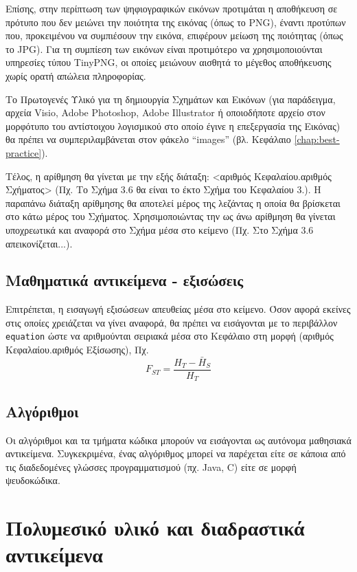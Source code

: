 Επίσης, στην περίπτωση των ψηφιογραφικών εικόνων προτιμάται η αποθήκευση σε
πρότυπο που δεν μειώνει την ποιότητα της εικόνας (όπως το PNG), έναντι προτύπων που,
προκειμένου να συμπιέσουν την εικόνα, επιφέρουν μείωση της ποιότητας (όπως το JPG).
Για τη συμπίεση των εικόνων είναι προτιμότερο να χρησιμοποιούνται υπηρεσίες τύπου
TinyPNG, οι οποίες μειώνουν αισθητά το μέγεθος αποθήκευσης χωρίς ορατή απώλεια
πληροφορίας.

Το Πρωτογενές Υλικό για τη δημιουργία Σχημάτων και Εικόνων (για παράδειγμα,
αρχεία Visio, Adobe Photoshop, Adobe Illustrator ή οποιοδήποτε αρχείο στον μορφότυπο
του αντίστοιχου λογισμικού στο οποίο έγινε η επεξεργασία της Εικόνας) θα πρέπει να
συμπεριλαμβάνεται στον φάκελο “images” (βλ. Κεφάλαιο \ref{chap:best-practice}).

Τέλος, η αρίθμηση θα γίνεται με την εξής διάταξη: <αριθμός Κεφαλαίου.αριθμός
Σχήματος> (Πχ. Το Σχήμα 3.6 θα είναι το έκτο Σχήμα του Κεφαλαίου 3.). Η παραπάνω
διάταξη αρίθμησης θα αποτελεί μέρος της λεζάντας η οποία θα βρίσκεται στο κάτω μέρος
του Σχήματος. Χρησιμοποιώντας την ως άνω αρίθμηση θα γίνεται υποχρεωτικά και
αναφορά στο Σχήμα μέσα στο κείμενο (Πχ. Στο Σχήμα 3.6 απεικονίζεται...).

\subsection{Μαθηματικά αντικείμενα - εξισώσεις}

Επιτρέπεται, η εισαγωγή εξισώσεων απευθείας μέσα στο κείμενο. Όσον αφορά εκείνες στις οποίες χρειάζεται να
γίνει αναφορά, θα πρέπει να εισάγονται με το περιβάλλον \texttt{equation} ώστε να αριθμούνται σειριακά
μέσα στο Κεφάλαιο στη μορφή (αριθμός Κεφαλαίου.αριθμός Εξίσωσης), Πχ.
\begin{equation}
\label{eq:11_19}
F_{ST}=\frac{H_{T}-\bar{H}_{S}}{H_{T}}
\end{equation}
\subsection{Αλγόριθμοι}

Οι αλγόριθμοι και τα τμήματα κώδικα μπορούν να εισάγονται ως αυτόνομα μαθησιακά
αντικείμενα. Συγκεκριμένα, ένας αλγόριθμος μπορεί να παρέχεται είτε σε κάποια από τις
διαδεδομένες γλώσσες προγραμματισμού (πχ. Java, C) είτε σε μορφή ψευδοκώδικα.

\section{Πολυμεσικό υλικό και διαδραστικά αντικείμενα}

